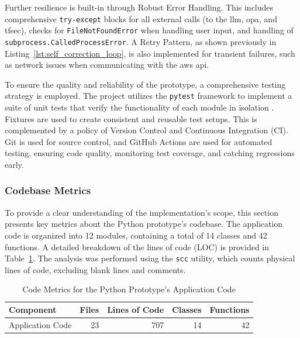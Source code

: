 Further resilience is built-in through Robust Error Handling. This includes comprehensive \texttt{try-except} blocks for all external calls (to the \gls{llm}, \gls{opa}, and tfsec), checks for \texttt{FileNotFoundError} when handling user input, and handling of \texttt{subprocess.CalledProcessError}. A Retry Pattern, as shown previously in Listing~\ref{lst:self_correction_loop}, is also implemented for transient failures, such as network issues when communicating with the \gls{aws} \gls{api}.

To ensure the quality and reliability of the prototype, a comprehensive testing strategy is employed. The project utilizes the \texttt{pytest} framework to implement a suite of unit tests that verify the functionality of each module in isolation \cite{noauthor_pytest_nodate}. Fixtures are used to create consistent and reusable test setups. This is complemented by a policy of Version Control and Continuous Integration (CI). Git is used for source control, and GitHub Actions are used for automated testing, ensuring code quality, monitoring test coverage, and catching regressions early.

\subsubsection{Codebase Metrics}


To provide a clear understanding of the implementation's scope, this section presents key metrics about the Python prototype's codebase. The application code is organized into 12 modules, containing a total of 14 classes and 42 functions. A detailed breakdown of the lines of code (LOC) is provided in Table~\ref{tab:code_metrics}. The analysis was performed using the \texttt{scc} utility, which counts physical lines of code, excluding blank lines and comments.

\begin{table}[htbp]
\centering
\caption{Code Metrics for the Python Prototype's Application Code}
\label{tab:code_metrics}
\begin{tabular}{lrrrr}
\toprule
\textbf{Component} & \textbf{Files} & \textbf{Lines of Code} & \textbf{Classes} & \textbf{Functions} \\
\midrule
Application Code & 23 & 707 & 14 & 42 \\
\bottomrule
\end{tabular}
\end{table}

